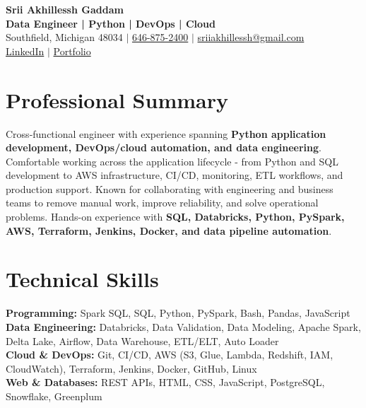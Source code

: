 \documentclass[letterpaper,10pt]{article}
\begin{document}
\fontsize{9.35pt}{10.45pt}\selectfont

\begin{center}
    {\LARGE \textbf{Srii Akhillessh Gaddam}} \\[-1pt]
    \textbf{Data Engineer | Python | DevOps | Cloud} \\[2pt]
    Southfield, Michigan 48034 $|$
    \href{tel:6468752400}{646-875-2400} $|$
    \href{mailto:sriiakhillessh@gmail.com}{sriiakhillessh@gmail.com} \\[1pt]
    \href{https://www.linkedin.com/in/srii-akhiilessh-gaddam-b48668191/}{LinkedIn} $|$
    \href{https://sriiakhillesshg.github.io/portfolio/}{Portfolio}
\end{center}
\vspace{-8pt}

\section{Professional Summary}
\small{Cross-functional engineer with experience spanning \textbf{Python application development, DevOps/cloud automation, and data engineering}. Comfortable working across the application lifecycle - from Python and SQL development to AWS infrastructure, CI/CD, monitoring, ETL workflows, and production support. Known for collaborating with engineering and business teams to remove manual work, improve reliability, and solve operational problems. Hands-on experience with \textbf{SQL, Databricks, Python, PySpark, AWS, Terraform, Jenkins, Docker, and data pipeline automation}.}

\section{Technical Skills}
\small{
\textbf{Programming:} Spark SQL, SQL, Python, PySpark, Bash, Pandas, JavaScript \\
\textbf{Data Engineering:} Databricks, Data Validation, Data Modeling, Apache Spark, Delta Lake, Airflow, Data Warehouse, ETL/ELT, Auto Loader \\
\textbf{Cloud \& DevOps:} Git, CI/CD, AWS (S3, Glue, Lambda, Redshift, IAM, CloudWatch), Terraform, Jenkins, Docker, GitHub, Linux \\
\textbf{Web \& Databases:} REST APIs, HTML, CSS, JavaScript, PostgreSQL, Snowflake, Greenplum
}
\end{document}
